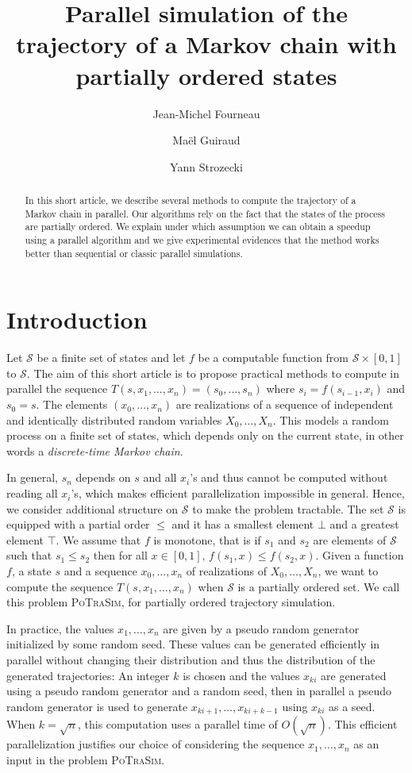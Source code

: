 \documentclass[a4paper,10pt]{article}
\title{Parallel simulation of the trajectory of a Markov chain with partially ordered states}
\author{Jean-Michel Fourneau \and Maël Guiraud \and Yann Strozecki}
\newcommand{\cS}{\mathcal{S}}
\begin{document}
\maketitle

\begin{abstract}
In this short article, we describe several methods to compute the trajectory of a Markov chain in parallel. 
Our algorithms rely on the fact that the states of the process are partially ordered. We explain under which assumption we can 
obtain a speedup using a parallel algorithm and we give experimental evidences that the method works better than sequential or classic parallel simulations.
\end{abstract}


\section{Introduction} %

Let $\cS$ be a finite set of states and let $f$ be a computable function from $\cS \times [0,1]$ to $\cS$. 
The aim of this short article is to propose practical methods to compute in parallel the sequence $T(s,x_1,\dots,x_n)= (s_0, \dots, s_n)$ where $s_i = f(s_{i-1},x_i)$ and $s_0 = s$. The elements $(x_0,\dots,x_n)$ are realizations of a sequence of independent and identically distributed random variables $X_0,\dots,X_n$. This models a random process on a finite set of states, which depends only on the current state, in other words a \emph{discrete-time Markov chain}.

In general,  $s_n$ depends on $s$ and all $x_i$'s and thus cannot be computed without reading all $x_i$'s,
which makes efficient parallelization impossible in general. Hence, we consider additional structure on $\cS$ to make the problem tractable. The set $\cS$ is equipped with a partial order $\leq$ and it has a smallest element $\bot$ and a greatest element $ \top$. We assume that $f$ is monotone, that is if $s_1$ and $s_2$ are elements of $\cS$ such that $s_1 \leq s_2$ then for all $x\in[0,1],\, f(s_1, x) \leq f(s_2, x)$. Given a function $f$, a state $s$ and a sequence $x_0,\dots,x_n$ of realizations of $X_0,\dots,X_n$, we want to compute the sequence $T(s,x_1,\dots,x_n)$ when $\cS$ is a partially ordered set. We call this problem \textsc{PoTraSim}, for partially ordered trajectory simulation.  

In practice, the values $x_1,\dots,x_n$ are given by a pseudo random generator initialized by some random seed.
These values can be generated efficiently in parallel without changing their distribution and thus the distribution of the generated 
trajectories: An integer $k$ is chosen and the values $x_{ki}$ are generated using a pseudo random generator and a random seed, then in parallel a pseudo random generator is used to generate $x_{ki +1},\dots, x_{ki + k - 1}$ using $x_{ki}$ as a seed. When $ k = \sqrt{n}$, this computation uses a parallel time of $O(\sqrt{n})$. This efficient parallelization justifies our choice of considering the sequence $x_1,\dots,x_n$ as an input in the problem \textsc{PoTraSim}.
\end{document}
